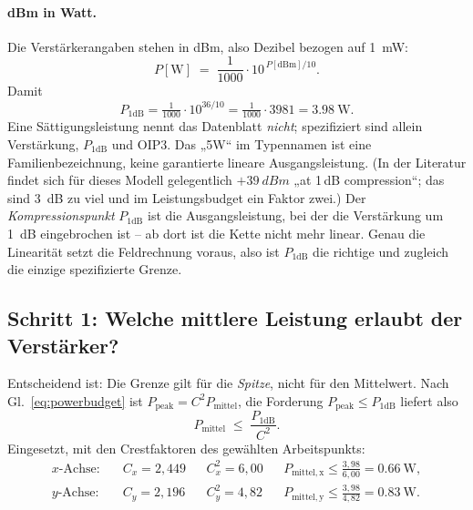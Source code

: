 \documentclass[11pt,a4paper]{article}
\newcommand{\crest}{\ensuremath{C}}
\begin{document}
\paragraph{dBm in Watt.}
Die Verstärkerangaben stehen in dBm, also Dezibel bezogen auf
\SI{1}{\milli\watt}:
\begin{equation}
  P[\mathrm{W}] \;=\; \frac{1}{1000}\cdot 10^{\,P[\mathrm{dBm}]/10} .
\end{equation}
Damit
\begin{equation}
  P_{1\mathrm{dB}} = \tfrac{1}{1000}\cdot10^{36/10}
                   = \tfrac{1}{1000}\cdot 3981 = \SI{3.98}{\watt}.
\end{equation}
Eine Sättigungsleistung nennt das Datenblatt \emph{nicht}; spezifiziert sind
allein Verstärkung, $P_{1\mathrm{dB}}$ und OIP3. Das „5W`` im Typennamen ist
eine Familienbezeichnung, keine garantierte lineare Ausgangsleistung.
(In der Literatur findet sich für dieses Modell gelegentlich
$+\SI{39}{dBm}$ „at 1\,dB compression``; das sind \SI{3}{\deci\bel} zu viel
und im Leistungsbudget ein Faktor zwei.)
Der \emph{Kompressionspunkt} $P_{1\mathrm{dB}}$ ist die Ausgangsleistung, bei
der die Verstärkung um \SI{1}{\deci\bel} eingebrochen ist -- ab dort ist die
Kette nicht mehr linear. Genau die Linearität setzt die Feldrechnung voraus,
also ist $P_{1\mathrm{dB}}$ die richtige und zugleich die einzige
spezifizierte Grenze.

\subsection{Schritt 1: Welche mittlere Leistung erlaubt der Verstärker?}

Entscheidend ist: Die Grenze gilt für die \emph{Spitze}, nicht für den
Mittelwert. Nach Gl.~\eqref{eq:powerbudget} ist
$P_\mathrm{peak}=\crest^2 P_\mathrm{mittel}$, die Forderung
$P_\mathrm{peak}\le P_{1\mathrm{dB}}$ liefert also
\begin{equation}
  P_\mathrm{mittel} \;\le\; \frac{P_{1\mathrm{dB}}}{\crest^{2}} .
  \label{eq:pavglimit}
\end{equation}
Eingesetzt, mit den Crestfaktoren des gewählten Arbeitspunkts:
\begin{align}
  \text{$x$-Achse:}\quad &\crest_x = 2{,}449
  &&\crest_x^2 = 6{,}00
  &&P_\mathrm{mittel,x} \le \frac{3{,}98}{6{,}00} = \SI{0.66}{\watt},\\
  \text{$y$-Achse:}\quad &\crest_y = 2{,}196
  &&\crest_y^2 = 4{,}82
  &&P_\mathrm{mittel,y} \le \frac{3{,}98}{4{,}82} = \SI{0.83}{\watt}.
\end{align}
\end{document}

